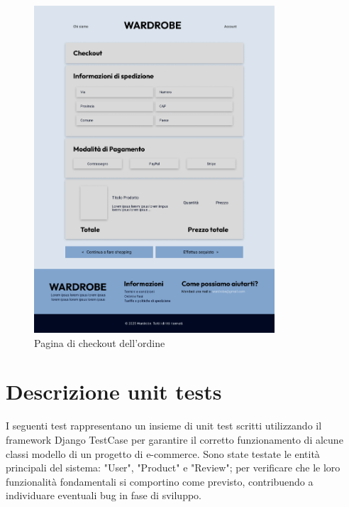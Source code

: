 \clearpage

\begin{figure}[h!]
\centering
\includegraphics[width=0.8\textwidth]{immagini/Mockups/checkout.png}
\caption{Pagina di checkout dell'ordine}
\end{figure}



\clearpage
\section{Descrizione unit tests}
I seguenti test rappresentano un insieme di unit test scritti utilizzando il framework Django TestCase per garantire il corretto funzionamento di alcune classi modello di un progetto di e-commerce. Sono state testate le entità principali del sistema: "User", "Product" e "Review"; per verificare che le loro funzionalità fondamentali si comportino come previsto, contribuendo a individuare eventuali bug in fase di sviluppo.\\
